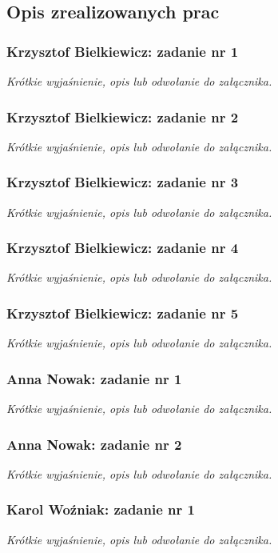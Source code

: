 \documentclass[12pt,a4paper,oneside]{article}
\theoremstyle{definition}
\numberwithin{equation}{section}
\begin{document}
\subsection {Opis zrealizowanych prac}
\subsubsection{Krzysztof Bielkiewicz: zadanie nr 1}
\label{1.3.1}
\textit{Krótkie wyjaśnienie, opis lub odwołanie do załącznika.}

\subsubsection{Krzysztof Bielkiewicz: zadanie nr 2}
\label{1.3.2}
\textit{Krótkie wyjaśnienie, opis lub odwołanie do załącznika.}

\subsubsection{Krzysztof Bielkiewicz: zadanie nr 3}
\label{1.3.3}
\textit{Krótkie wyjaśnienie, opis lub odwołanie do załącznika.}

\subsubsection{Krzysztof Bielkiewicz: zadanie nr 4}
\label{1.3.4}
\textit{Krótkie wyjaśnienie, opis lub odwołanie do załącznika.}

\subsubsection{Krzysztof Bielkiewicz: zadanie nr 5}
\label{1.3.5}
\textit{Krótkie wyjaśnienie, opis lub odwołanie do załącznika.}


\subsubsection{Anna Nowak: zadanie nr 1}
\textit{Krótkie wyjaśnienie, opis lub odwołanie do załącznika.}
\subsubsection{Anna Nowak: zadanie nr 2}
\textit{Krótkie wyjaśnienie, opis lub odwołanie do załącznika.}


\subsubsection{Karol Woźniak: zadanie nr 1}
\textit{Krótkie wyjaśnienie, opis lub odwołanie do załącznika.}
\end{document}
